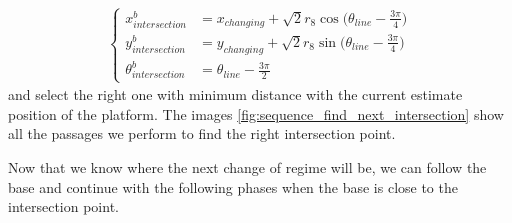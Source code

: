 \begin{itemize}
\begin{itemize}
\begin{align}
\begin{cases}
x_{intersection}^b &= x_{changing} + \sqrt{2}r_8\cos{\Big(\theta_{line} - \frac{3\pi}{4}\Big) }\\
y_{intersection}^b &= y_{changing} + \sqrt{2}r_8\sin{\Big(\theta_{line} - \frac{3\pi}{4}\Big) }\\
\theta_{intersection}^b &=  \theta_{line} - \frac{3\pi}{2}
\label{eq:finalstatecurveb}
\end{cases}
\end{align}
and select the right one with minimum distance with the current estimate position of the platform.
The images  \ref{fig:sequence_find_next_intersection} show all the passages we perform to find the right intersection point.
\end{itemize}
Now that we know where the next change of regime will be, we can follow the base and continue with the following phases when the base is close to the intersection point.


\end{itemize}
